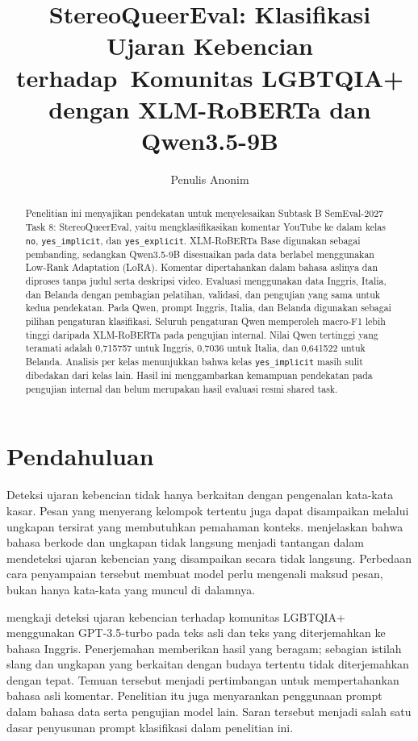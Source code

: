 \documentclass[11pt]{article}
\title{StereoQueerEval: Klasifikasi Ujaran Kebencian terhadap\
Komunitas LGBTQIA+ dengan XLM-RoBERTa dan Qwen3.5-9B}
\author{Penulis Anonim}
\begin{document}
\nolinenumbers
\raggedbottom
\maketitle
\begin{abstract}
Penelitian ini menyajikan pendekatan untuk menyelesaikan Subtask B SemEval-2027 Task 8: StereoQueerEval, yaitu mengklasifikasikan komentar YouTube ke dalam kelas \texttt{no}, \texttt{yes\_implicit}, dan \texttt{yes\_explicit}. XLM-RoBERTa Base digunakan sebagai pembanding, sedangkan Qwen3.5-9B disesuaikan pada data berlabel menggunakan Low-Rank Adaptation (LoRA). Komentar dipertahankan dalam bahasa aslinya dan diproses tanpa judul serta deskripsi video. Evaluasi menggunakan data Inggris, Italia, dan Belanda dengan pembagian pelatihan, validasi, dan pengujian yang sama untuk kedua pendekatan. Pada Qwen, prompt Inggris, Italia, dan Belanda digunakan sebagai pilihan pengaturan klasifikasi. Seluruh pengaturan Qwen memperoleh macro-F1 lebih tinggi daripada XLM-RoBERTa pada pengujian internal. Nilai Qwen tertinggi yang teramati adalah 0,715757 untuk Inggris, 0,7036 untuk Italia, dan 0,641522 untuk Belanda. Analisis per kelas menunjukkan bahwa kelas \texttt{yes\_implicit} masih sulit dibedakan dari kelas lain. Hasil ini menggambarkan kemampuan pendekatan pada pengujian internal dan belum merupakan hasil evaluasi resmi shared task.
\end{abstract}

\section{Pendahuluan}
\label{sec:pendahuluan}
Deteksi ujaran kebencian tidak hanya berkaitan dengan pengenalan kata-kata kasar. Pesan yang menyerang kelompok tertentu juga dapat disampaikan melalui ungkapan tersirat yang membutuhkan pemahaman konteks. \citet{elsherief-etal-2021-latent} menjelaskan bahwa bahasa berkode dan ungkapan tidak langsung menjadi tantangan dalam mendeteksi ujaran kebencian yang disampaikan secara tidak langsung. Perbedaan cara penyampaian tersebut membuat model perlu mengenali maksud pesan, bukan hanya kata-kata yang muncul di dalamnya.

\citet{chan-etal-2024-hate} mengkaji deteksi ujaran kebencian terhadap komunitas LGBTQIA+ menggunakan GPT-3.5-turbo pada teks asli dan teks yang diterjemahkan ke bahasa Inggris. Penerjemahan memberikan hasil yang beragam; sebagian istilah slang dan ungkapan yang berkaitan dengan budaya tertentu tidak diterjemahkan dengan tepat. Temuan tersebut menjadi pertimbangan untuk mempertahankan bahasa asli komentar. Penelitian itu juga menyarankan penggunaan prompt dalam bahasa data serta pengujian model lain. Saran tersebut menjadi salah satu dasar penyusunan prompt klasifikasi dalam penelitian ini.
\end{document}
